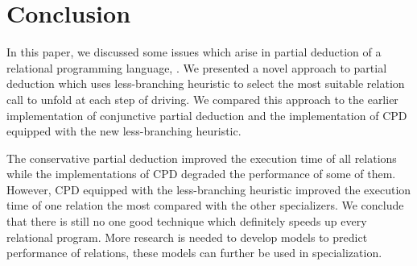 \section{Conclusion}

In this paper, we discussed some issues which arise in partial deduction of a relational programming language, \mk{}.
We presented a novel approach to partial deduction which uses less-branching heuristic to select the most suitable relation call to unfold at each step of driving.
We compared this approach to the earlier implementation of conjunctive partial deduction and the implementation of CPD equipped with the new less-branching heuristic.

The conservative partial deduction improved the execution time of all relations while the implementations of CPD degraded the performance of some of them.
However, CPD equipped with the less-branching heuristic improved the execution time of one relation the most compared with the other specializers.
We conclude that there is still no one good technique which definitely speeds up every relational program.
More research is needed to develop models to predict performance of relations, these models can further be used in specialization.




